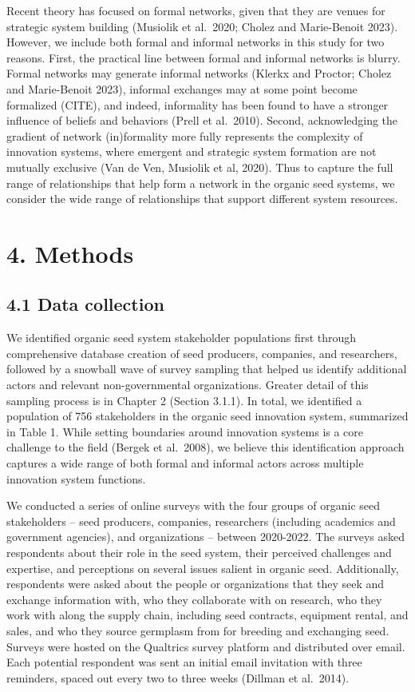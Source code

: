 \documentclass[twoside,12pt,final]{ucthesis-CA2012}
\begin{document}
\begin{ucmainmatter}
Recent theory has focused on formal networks, given that they are venues
for strategic system building (Musiolik et al.~2020; Cholez and
Marie-Benoit 2023). However, we include both formal and informal
networks in this study for two reasons. First, the practical line
between formal and informal networks is blurry. Formal networks may
generate informal networks (Klerkx and Proctor; Cholez and Marie-Benoit
2023), informal exchanges may at some point become formalized (CITE),
and indeed, informality has been found to have a stronger influence of
beliefs and behaviors (Prell et al.~2010). Second, acknowledging the
gradient of network (in)formality more fully represents the complexity
of innovation systems, where emergent and strategic system formation are
not mutually exclusive (Van de Ven, Musiolik et al, 2020). Thus to
capture the full range of relationships that help form a network in the
organic seed systems, we consider the wide range of relationships that
support different system resources.

\hypertarget{methods-2}{%
\section{4. Methods}\label{methods-2}}

\hypertarget{data-collection}{%
\subsection{4.1 Data collection}\label{data-collection}}

We identified organic seed system stakeholder populations first through
comprehensive database creation of seed producers, companies, and
researchers, followed by a snowball wave of survey sampling that helped
us identify additional actors and relevant non-governmental
organizations. Greater detail of this sampling process is in Chapter 2
(Section 3.1.1). In total, we identified a population of 756
stakeholders in the organic seed innovation system, summarized in
Table 1. While setting boundaries around innovation systems is a core
challenge to the field (Bergek et al.~2008), we believe this
identification approach captures a wide range of both formal and
informal actors across multiple innovation system functions.

We conducted a series of online surveys with the four groups of organic
seed stakeholders -- seed producers, companies, researchers (including
academics and government agencies), and organizations -- between
2020-2022. The surveys asked respondents about their role in the seed
system, their perceived challenges and expertise, and perceptions on
several issues salient in organic seed. Additionally, respondents were
asked about the people or organizations that they seek and exchange
information with, who they collaborate with on research, who they work
with along the supply chain, including seed contracts, equipment rental,
and sales, and who they source germplasm from for breeding and
exchanging seed. Surveys were hosted on the Qualtrics survey platform
and distributed over email. Each potential respondent was sent an
initial email invitation with three reminders, spaced out every two to
three weeks (Dillman et al.~2014).


\end{ucmainmatter}
\end{document}
